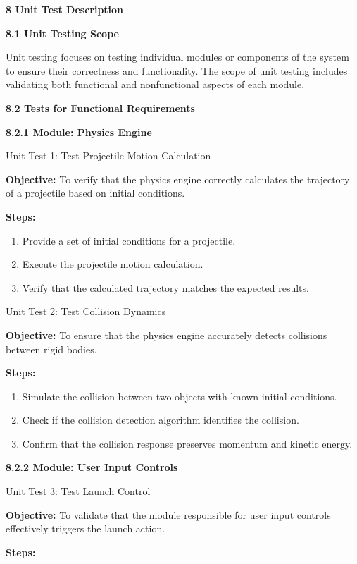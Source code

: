 \documentclass[
]{article}
\begin{document}
\textbf{8 Unit Test Description}

\textbf{8.1 Unit Testing Scope}

Unit testing focuses on testing individual modules or components of the
system to ensure their correctness and functionality. The scope of unit
testing includes validating both functional and nonfunctional aspects of
each module.

\textbf{8.2 Tests for Functional Requirements}

\textbf{8.2.1 Module: Physics Engine}

Unit Test 1: Test Projectile Motion Calculation

\textbf{Objective:} To verify that the physics engine correctly
calculates the trajectory of a projectile based on initial conditions.

\textbf{Steps:}

\begin{enumerate}
\def\labelenumi{\arabic{enumi}.}
\item
  Provide a set of initial conditions for a projectile.
\item
  Execute the projectile motion calculation.
\item
  Verify that the calculated trajectory matches the expected results.
\end{enumerate}

Unit Test 2: Test Collision Dynamics

\textbf{Objective:} To ensure that the physics engine accurately detects
collisions between rigid bodies.

\textbf{Steps:}

\begin{enumerate}
\def\labelenumi{\arabic{enumi}.}
\item
  Simulate the collision between two objects with known initial
  conditions.
\item
  Check if the collision detection algorithm identifies the collision.
\item
  Confirm that the collision response preserves momentum and kinetic
  energy.
\end{enumerate}

\textbf{8.2.2 Module: User Input Controls}

Unit Test 3: Test Launch Control

\textbf{Objective:} To validate that the module responsible for user
input controls effectively triggers the launch action.

\textbf{Steps:}
\end{document}
